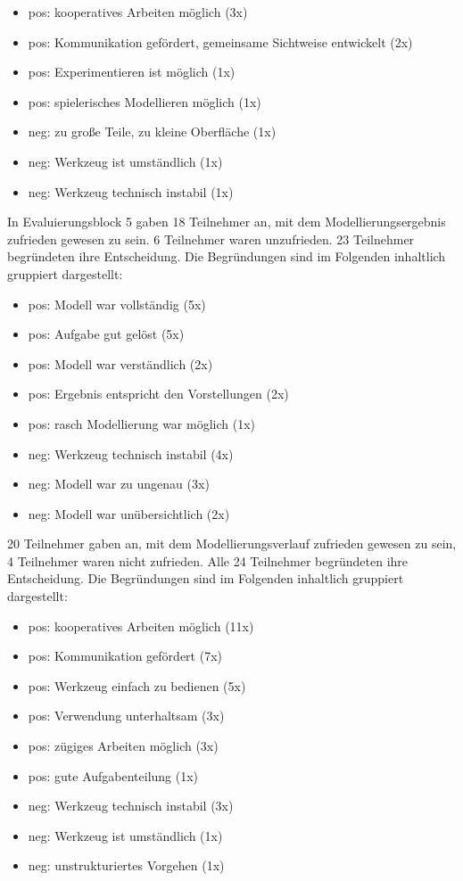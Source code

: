 \begin{itemize}
	\item pos: kooperatives Arbeiten möglich (3x)
	\item pos: Kommunikation gefördert, gemeinsame Sichtweise entwickelt (2x)
	\item pos: Experimentieren ist möglich (1x)
	\item pos: spielerisches Modellieren möglich (1x)
	\item neg: zu große Teile, zu kleine Oberfläche (1x)
	\item neg: Werkzeug ist umständlich (1x)
	\item neg: Werkzeug technisch instabil (1x)
\end{itemize}

In Evaluierungsblock 5 gaben 18 Teilnehmer an, mit dem Modellierungsergebnis zufrieden gewesen zu sein. 6 Teilnehmer waren unzufrieden. 23 Teilnehmer begründeten ihre Entscheidung. Die Begründungen sind im Folgenden inhaltlich gruppiert dargestellt:

\begin{itemize}
	\item pos: Modell war vollständig (5x)
	\item pos: Aufgabe gut gelöst (5x)
	\item pos: Modell war verständlich (2x)
	\item pos: Ergebnis entspricht den Vorstellungen (2x)
	\item pos: rasch Modellierung war möglich (1x)
	\item neg: Werkzeug technisch instabil (4x)
	\item neg: Modell war zu ungenau (3x)
	\item neg: Modell war unübersichtlich (2x)
\end{itemize}

20 Teilnehmer gaben an, mit dem Modellierungsverlauf zufrieden gewesen zu sein, 4 Teilnehmer waren nicht zufrieden. Alle 24 Teilnehmer begründeten ihre Entscheidung. Die Begründungen sind im Folgenden inhaltlich gruppiert dargestellt:

\begin{itemize}
	\item pos: kooperatives Arbeiten möglich (11x)
	\item pos: Kommunikation gefördert (7x)
	\item pos: Werkzeug einfach zu bedienen (5x)
	\item pos: Verwendung unterhaltsam (3x)
	\item pos: zügiges Arbeiten möglich (3x)
	\item pos: gute Aufgabenteilung (1x)
	\item neg: Werkzeug technisch instabil (3x)
	\item neg: Werkzeug ist umständlich (1x)
	\item neg: unstrukturiertes Vorgehen (1x)
\end{itemize}

